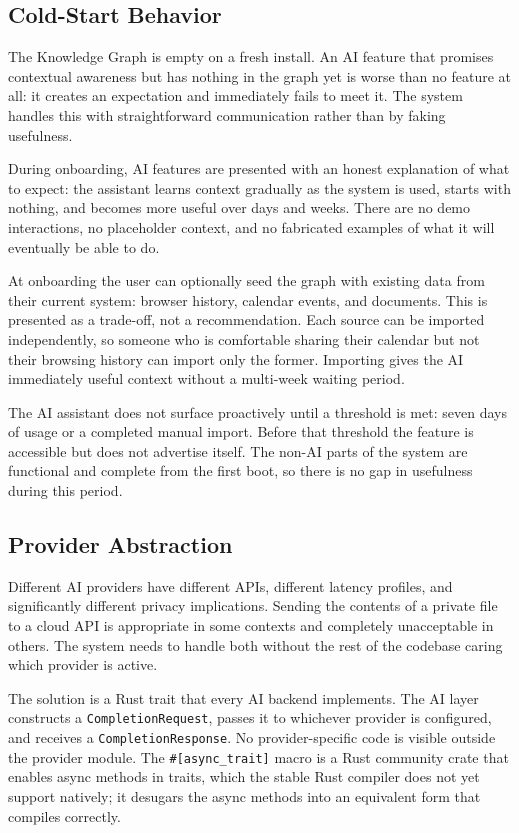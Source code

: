 \subsection{Cold-Start Behavior}
\label{sec:ai-coldstart}

The Knowledge Graph is empty on a fresh install. An AI feature that promises
contextual awareness but has nothing in the graph yet is worse than no feature
at all: it creates an expectation and immediately fails to meet it. The system
handles this with straightforward communication rather than by faking
usefulness.

During onboarding, AI features are presented with an honest explanation of
what to expect: the assistant learns context gradually as the system is used,
starts with nothing, and becomes more useful over days and weeks. There are no
demo interactions, no placeholder context, and no fabricated examples of what
it will eventually be able to do.

At onboarding the user can optionally seed the graph with existing data from
their current system: browser history, calendar events, and documents. This is
presented as a trade-off, not a recommendation. Each source can be imported
independently, so someone who is comfortable sharing their calendar but not
their browsing history can import only the former. Importing gives the AI
immediately useful context without a multi-week waiting period.

The AI assistant does not surface proactively until a threshold is met: seven
days of usage or a completed manual import. Before that threshold the feature
is accessible but does not advertise itself. The non-AI parts of the system are
functional and complete from the first boot, so there is no gap in usefulness
during this period.

\subsection{Provider Abstraction}
\label{sec:ai-providers}

Different AI providers have different APIs, different latency profiles, and
significantly different privacy implications. Sending the contents of a private
file to a cloud API is appropriate in some contexts and completely unacceptable
in others. The system needs to handle both without the rest of the codebase
caring which provider is active.

The solution is a Rust trait that every AI backend implements. The AI layer
constructs a \texttt{CompletionRequest}, passes it to whichever provider is
configured, and receives a \texttt{CompletionResponse}. No provider-specific
code is visible outside the provider module. The \texttt{\#[async\_trait]}
macro is a Rust community crate that enables async methods in traits, which
the stable Rust compiler does not yet support natively; it desugars the async
methods into an equivalent form that compiles correctly.

